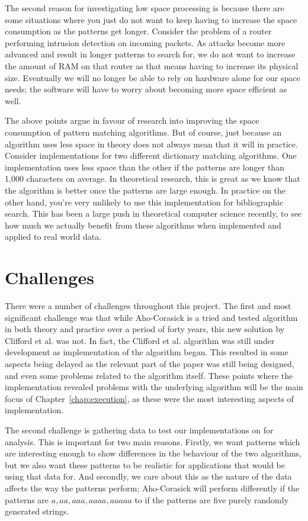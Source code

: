 \documentclass[ %
                    author={Dominic Joseph Moylett},
                    degree={MEng},
                     title={Dictionary Matching with Fingerprints},
                  subtitle={An Empirical Analysis},
                      type={research},
                      year={2015} ]{dissertation}
\begin{document}
The second reason for investigating low space processing is because there are some situations where you just do not want to keep having to increase the space consumption as the patterns get longer. Consider the problem of a router performing intrusion detection on incoming packets. As attacks become more advanced and result in longer patterns to search for, we do not want to increase the amount of RAM on that router as that means having to increase its physical size. Eventually we will no longer be able to rely on hardware alone for our space needs; the software will have to worry about becoming more space efficient as well.

The above points argue in favour of research into improving the space consumption of pattern matching algorithms. But of course, just because an algorithm uses less space in theory does not always mean that it will in practice. Consider implementations for two different dictionary matching algorithms. One implementation uses less space than the other if the patterns are longer than 1,000 characters on average. In theoretical research, this is great as we know that the algorithm is better once the patterns are large enough. In practice on the other hand, you're very unlikely to use this implementation for bibliographic search. This has been a large push in theoretical computer science recently, to see how much we actually benefit from these algorithms when implemented and applied to real world data.

\section{Challenges}
\label{sec:challenges}

There were a number of challenges throughout this project. The first and most significant challenge was that while Aho-Corasick is a tried and tested algorithm in both theory and practice over a period of forty years, this new solution by Clifford et al. was not. In fact, the Clifford et al. algorithm was still under development as implementation of the algorithm began. This resulted in some aspects being delayed as the relevant part of the paper was still being designed, and even some problems related to the algorithm itself. These points where the implementation revealed problems with the underlying algorithm will be the main focus of Chapter~\ref{chap:execution}, as these were the most interesting aspects of implementation.

The second challenge is gathering data to test our implementations on for analysis. This is important for two main reasons. Firstly, we want patterns which are interesting enough to show differences in the behaviour of the two algorithms, but we also want these patterns to be realistic for applications that would be using that data for. And secondly, we care about this as the nature of the data affects the way the patterns perform; Aho-Corasick will perform differently if the patterns are $a, aa, aaa, aaaa, aaaaa$ to if the patterns are five purely randomly generated strings.
\end{document}
